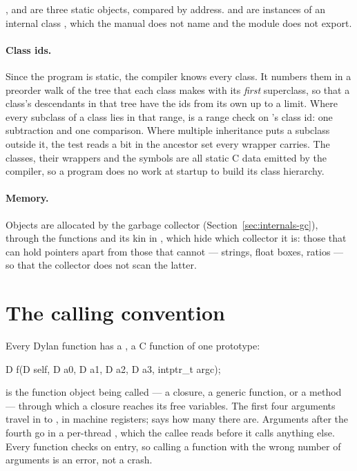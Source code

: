 ,  and \code{()} are three static objects, compared
by address.  and  are instances of an internal class
, which the manual does not name and the 
module does not export.

\paragraph{Class ids.} 
Since the program is static, the compiler knows every class. It numbers
them in a preorder walk of the tree that each class makes with its
\emph{first} superclass, so that a class's descendants in that tree have
the ids from its own up to a limit. Where every subclass of a class lies
in that range,  is a range check on 's
class id: one subtraction and one comparison. Where multiple inheritance
puts a subclass outside it, the test reads a bit in the ancestor set
every wrapper carries. The classes, their wrappers and the symbols are
all static C data emitted by the compiler, so a program does no work at
startup to build its class hierarchy.

\paragraph{Memory.}
Objects are allocated by the garbage collector
(Section~\ref{sec:internals-gc}), through the functions
 and its kin in , which hide which
collector it is: those that can hold pointers apart from those that
cannot --- strings, float boxes, ratios --- so that the collector does
not scan the latter.

\section{The calling convention}\label{sec:internals-calls-convention}

Every Dylan function has a , a C function of one
prototype:

\begin{ccode}
D f(D self, D a0, D a1, D a2, D a3, intptr_t argc);
\end{ccode}

 is the function object being called --- a closure, a
generic function, or a method --- through which a closure reaches its
free variables. The first four arguments travel in  to
, in machine registers;  says how many there are.
Arguments after the fourth go in a per-thread , which
the callee reads before it calls anything else. Every function checks
 on entry, so calling a function with the wrong number of
arguments is an error, not a crash.


